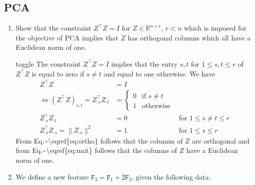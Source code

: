 \documentclass[letterpaper,10pt,english]{jupyterBook}
\begin{document}
\subsection{PCA}
\label{\detokenize{dim_reduction_exercises:pca}}\begin{enumerate}
%
\item {} 
\sphinxAtStartPar
Show that the constraint \(Z^\top Z=I\) for \(Z\in\mathbb{R}^{n\times r}\), \(r<n\) which is imposed for the objective of PCA implies that \(Z\) has orthogonal columns which all have a Euclidean norm of one.

\begin{sphinxuseclass}{toggle}
\sphinxAtStartPar
The constraint \(Z^\top Z=I\) implies that the entry \(s,t\) for \(1\leq s,t\leq r\) of \(Z^\top Z\) is equal to zero if \(s\neq t\) and equal to one otherwise. We have
\label{equation:dim_reduction_exercises:ee39f839-0db8-4d5e-82b0-f019dc7dd855}\begin{align}
    Z^\top Z &=I\nonumber\\
    \Leftrightarrow (Z^\top Z)_{s,t}=Z_{\cdot s}^\top Z_{\cdot t}&=\begin{cases}
0& \text{if } s\neq t\\
1& \text{otherwise}
\end{cases}\nonumber\\
Z_{\cdot s}^\top Z_{\cdot t}&= 0 &\text{for } 1\leq s\neq t\leq r \label{eq:ortho}\\
Z_{\cdot s}^\top Z_{\cdot s} = \lVert Z_{\cdot s}\rVert^2 &=1 &\text{for }1\leq s\leq r \label{eq:unit}
\end{align}
\sphinxAtStartPar
From Eq.\textasciitilde{}\textbackslash{}eqref\{eq:ortho\} follows that the columns of \(Z\) are orthogonal and from Eq.\textasciitilde{}\textbackslash{}eqref\{eq:unit\} follows that the columns of \(Z\) have a Euclidean norm of one.

\end{sphinxuseclass}
\item {} 
\sphinxAtStartPar
We define a new feature \(\mathtt{F}_3 = \mathtt{F}_1 + 2\mathtt{F}_2\), given the following data:



\end{enumerate}
\end{document}
